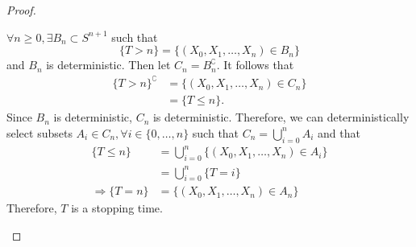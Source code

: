 \documentclass[
  coursecode={MTHE 455},
  assignmentname={Assignment \assignmentnumber},
  studentnumber=20053722,
  name={Bryan Hoang},
  draft,
]{
  ltxanswer%
}
\begin{document}
\begin{questions}
\begin{parts}
\begin{solution}
\begin{proof}
\begin{proofpart}
            \(\forall n \ge 0, \exists B_{n} \subset S^{n+1}\) such that
            \begin{equation*}
              \{T > n\} = \{(X_{0},X_{1},\dotsc,X_{n}) \in B_{n}\}
            \end{equation*}
            and \(B_{n}\) is deterministic. Then let \(C_{n} = B_{n}^{\complement}\). It follows that
            \begin{align*}
              \{T > n\}^{\complement} &= \{(X_{0},X_{1},\dotsc,X_{n}) \in C_{n}\} \\
                                      &= \{T \le n\}.
            \end{align*}
            Since \(B_{n}\) is deterministic, \(C_{n}\) is deterministic. Therefore, we can deterministically select subsets \(A_{i} \in C_{n}, \forall i \in \{0, \dotsc, n\}\) such that \(C_{n} = \bigcup_{i=0}^{n} A_{i}\) and that
            \begin{align*}
              \{T \le n\}           &= \bigcup_{i=0}^{n} \{(X_{0},X_{1},\dotsc,X_{n}) \in A_{i}\} \\
                                    &= \bigcup_{i=0}^{n} \{T = i\}                                \\
              \Rightarrow \{T = n\} &= \{(X_{0},X_{1},\dotsc,X_{n}) \in A_{n}\}
            \end{align*}
            Therefore, \(T\) is a stopping time.
          \end{proofpart}
        \end{proof}
      \end{solution}


\end{parts}
\end{questions}
\end{document}
